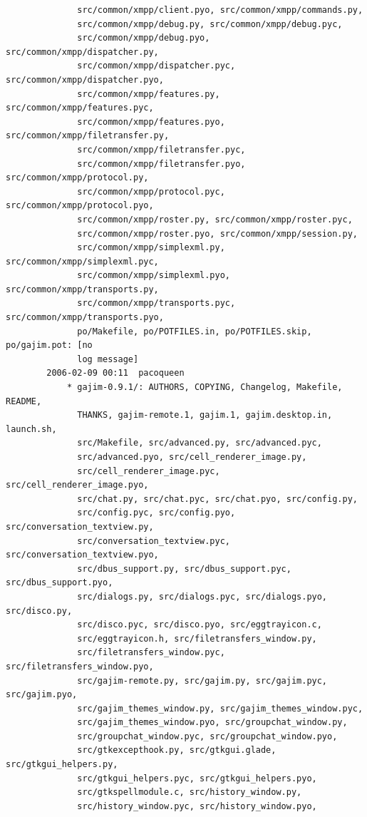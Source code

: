 \documentclass[a4paper]{article}
\begin{document}
\begin{verbatim}
              src/common/xmpp/client.pyo, src/common/xmpp/commands.py,
              src/common/xmpp/debug.py, src/common/xmpp/debug.pyc,
              src/common/xmpp/debug.pyo, src/common/xmpp/dispatcher.py,
              src/common/xmpp/dispatcher.pyc, src/common/xmpp/dispatcher.pyo,
              src/common/xmpp/features.py, src/common/xmpp/features.pyc,
              src/common/xmpp/features.pyo, src/common/xmpp/filetransfer.py,
              src/common/xmpp/filetransfer.pyc,
              src/common/xmpp/filetransfer.pyo, src/common/xmpp/protocol.py,
              src/common/xmpp/protocol.pyc, src/common/xmpp/protocol.pyo,
              src/common/xmpp/roster.py, src/common/xmpp/roster.pyc,
              src/common/xmpp/roster.pyo, src/common/xmpp/session.py,
              src/common/xmpp/simplexml.py, src/common/xmpp/simplexml.pyc,
              src/common/xmpp/simplexml.pyo, src/common/xmpp/transports.py,
              src/common/xmpp/transports.pyc, src/common/xmpp/transports.pyo,
              po/Makefile, po/POTFILES.in, po/POTFILES.skip, po/gajim.pot: [no
              log message]
        2006-02-09 00:11  pacoqueen
            * gajim-0.9.1/: AUTHORS, COPYING, Changelog, Makefile, README,
              THANKS, gajim-remote.1, gajim.1, gajim.desktop.in, launch.sh,
              src/Makefile, src/advanced.py, src/advanced.pyc,
              src/advanced.pyo, src/cell_renderer_image.py,
              src/cell_renderer_image.pyc, src/cell_renderer_image.pyo,
              src/chat.py, src/chat.pyc, src/chat.pyo, src/config.py,
              src/config.pyc, src/config.pyo, src/conversation_textview.py,
              src/conversation_textview.pyc, src/conversation_textview.pyo,
              src/dbus_support.py, src/dbus_support.pyc, src/dbus_support.pyo,
              src/dialogs.py, src/dialogs.pyc, src/dialogs.pyo, src/disco.py,
              src/disco.pyc, src/disco.pyo, src/eggtrayicon.c,
              src/eggtrayicon.h, src/filetransfers_window.py,
              src/filetransfers_window.pyc, src/filetransfers_window.pyo,
              src/gajim-remote.py, src/gajim.py, src/gajim.pyc, src/gajim.pyo,
              src/gajim_themes_window.py, src/gajim_themes_window.pyc,
              src/gajim_themes_window.pyo, src/groupchat_window.py,
              src/groupchat_window.pyc, src/groupchat_window.pyo,
              src/gtkexcepthook.py, src/gtkgui.glade, src/gtkgui_helpers.py,
              src/gtkgui_helpers.pyc, src/gtkgui_helpers.pyo,
              src/gtkspellmodule.c, src/history_window.py,
              src/history_window.pyc, src/history_window.pyo,

\end{verbatim}
\end{document}
